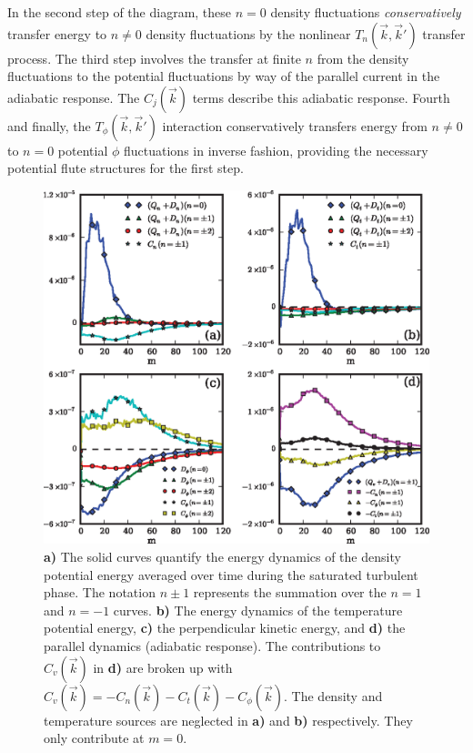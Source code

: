 \documentclass[showpacs,preprintnumbers,amsmath,amssymb,superscriptaddress]{revtex4}
\begin{document}
In the second step of the diagram, these $n=0$ density fluctuations
\emph{conservatively} transfer energy to $n \ne 0$ density fluctuations by the nonlinear $T_n(\vec{k},\vec{k}')$ transfer process. 
The third step involves the transfer at finite $n$ from the density
fluctuations to the potential fluctuations by way of the parallel current in the adiabatic response. The $C_j(\vec{k})$ terms describe this adiabatic response.
Fourth and finally, the $T_\phi(\vec{k},\vec{k}')$ interaction conservatively transfers energy from
$n \ne 0$ to $n=0$ potential $\phi$ fluctuations in inverse fashion, providing the necessary potential flute structures for the first step.

\begin{figure}
\includegraphics[]{linear_dynamics}
\hfil
\caption{\textbf{a)} The solid curves quantify the energy dynamics of the density potential energy averaged over time during the saturated turbulent phase. The notation $n \pm 1$ represents the
summation over the $n=1$ and $n=-1$ curves. \textbf{b)} The energy dynamics of the temperature potential energy, \textbf{c)} the perpendicular kinetic energy, and \textbf{d)} the parallel
dynamics (adiabatic response). The contributions to $C_v(\vec{k})$ in \textbf{d)} are broken up with $C_v(\vec{k}) = -C_n(\vec{k}) - C_t(\vec{k}) - C_\phi(\vec{k})$. 
The density and temperature sources are neglected in \textbf{a)} and \textbf{b)} respectively. They only contribute at $m=0$.}
\label{nc_dynamics_figures}
\end{figure}
\end{document}
